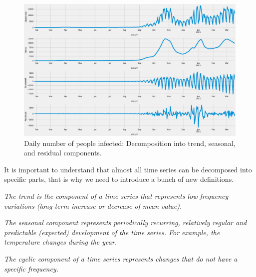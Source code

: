 \begin{figure}[!ht]
\centering
\includegraphics[width=1\textwidth, height=0.9\textwidth]{figures/chapter_02/daily_inf_decomposed.png}
\caption{Daily number of people infected: Decomposition into trend, seasonal, and residual components.}
\label{fig:daily_inf_decomposed}
\end{figure}

It is important to understand that almost all time series can be decomposed into specific parts, that is why we need to introduce a bunch of new definitions.

\begin{definition}
\textit{The trend is the component of a time series that represents low frequency variations (long-term increase or decrease of mean value).}
\end{definition}

\begin{definition}
\textit{The seasonal component represents periodically recurring, relatively regular and predictable (expected) development of the time series. For example, the temperature changes during the year.}
\label{def_seasonal}
\end{definition}

\begin{definition}
\textit{The cyclic component of a time series represents changes that do not have a specific frequency.}
\end{definition}

